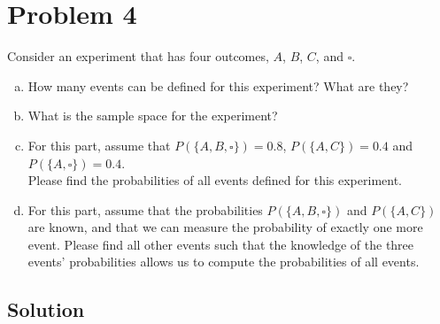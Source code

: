 \section{Problem 4}
Consider an experiment that has four outcomes, $A$, $B$, $C$, and $\square$.

\begin{enumerate}[a.]
	\item How many events can be defined for this experiment? What are they?
	\item  What is the sample space for the experiment?
	\item For this part, assume that $P(\{A, B, \square\}) = 0.8$, $P(\{A, C\}) = 0.4$ and $P(\{A, \square\}) = 0.4$.\\
	Please find the probabilities of all events defined for this experiment.
	\item For this part, assume that the probabilities $P(\{A, B, \square\})$ and $P(\{A, C\})$ are known, and that we can measure the probability of exactly one more event. Please find all other events such that the knowledge of the three events' probabilities allows us to compute the probabilities of all events.
\end{enumerate}

\subsection{Solution}